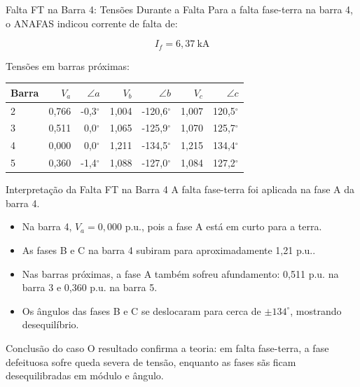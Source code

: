 \documentclass[aspectratio=169,11pt]{beamer}
\newcommand{\pu}{p.u.}
\begin{document}
\begin{frame}{Falta FT na Barra 4: Tensões Durante a Falta}
  Para a falta fase-terra na barra 4, o ANAFAS indicou corrente de falta de:

  \[
    I_f = 6{,}37\ \text{kA}
  \]

  Tensões em barras próximas:

  \begin{table}
    \centering
    \scriptsize
    \begin{tabular}{lrrrrrr}
      \toprule
      Barra & $V_a$ & $\angle a$ & $V_b$ & $\angle b$ & $V_c$ & $\angle c$ \\
      \midrule
      2 & 0,766 & -0,3$^\circ$ & 1,004 & -120,6$^\circ$ & 1,007 & 120,5$^\circ$ \\
      3 & 0,511 & 0,0$^\circ$ & 1,065 & -125,9$^\circ$ & 1,070 & 125,7$^\circ$ \\
      4 & 0,000 & 0,0$^\circ$ & 1,211 & -134,5$^\circ$ & 1,215 & 134,4$^\circ$ \\
      5 & 0,360 & -1,4$^\circ$ & 1,088 & -127,0$^\circ$ & 1,084 & 127,2$^\circ$ \\
      \bottomrule
    \end{tabular}
  \end{table}
\end{frame}

\begin{frame}{Interpretação da Falta FT na Barra 4}
  A falta fase-terra foi aplicada na fase A da barra 4.

  \begin{itemize}
    \item Na barra 4, $V_a = 0{,}000$ \pu, pois a fase A está em curto para a terra.
    \item As fases B e C na barra 4 subiram para aproximadamente 1,21 \pu.
    \item Nas barras próximas, a fase A também sofreu afundamento: 0,511 \pu{} na barra 3 e 0,360 \pu{} na barra 5.
    \item Os ângulos das fases B e C se deslocaram para cerca de $\pm 134^\circ$, mostrando desequilíbrio.
  \end{itemize}

  \begin{block}{Conclusão do caso}
    O resultado confirma a teoria: em falta fase-terra, a fase defeituosa sofre queda severa de tensão, enquanto as fases sãs ficam desequilibradas em módulo e ângulo.
  \end{block}
\end{frame}
\end{document}
